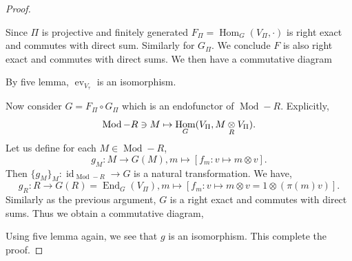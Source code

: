 \documentclass[8pt]{article}
\DeclareMathOperator{\Hom}{Hom}
\DeclareMathOperator{\End}{End}
\DeclareMathOperator{\Mod}{Mod}
\DeclareMathOperator{\id}{id}
\DeclareMathOperator{\ev}{ev}
\newcommand{\tens}[1]{%
  \mathbin{\mathop{\otimes}\displaylimits_{#1}}%
}
\begin{document}
\begin{proof}
  \begin{center}
  \end{center}
  Since $\Pi$ is projective and finitely generated $F_\Pi=\Hom_G(V_\Pi,\cdot)$ is right exact and commutes with direct sum. Similarly for $G_\Pi$. We conclude $F$ is also right exact and commutes with direct sums.
  We then have a commutative diagram
  \begin{center}
  \end{center}
  By five lemma, $\ev_{V_\tau}$ is an isomorphism.
  \par Now consider $G = F_\Pi\circ G_\Pi$ which is an endofunctor of $\Mod-R$. Explicitly,
  \begin{equation*}
    \Mod-R\ni M\mapsto \Hom_G(V_\Pi,M\tens{R}V_\Pi).
  \end{equation*}
  Let us define for each $M\in \Mod-R$,
  \begin{equation*}
    g_M:M\to G(M), m\mapsto [f_m:v\mapsto m\otimes v].
  \end{equation*}
  Then $\{g_M\}_{M}:\id_{\Mod-R}\to G$ is a natural transformation. We have,
  \begin{equation*}
    g_R:R\to G(R) = \End_G(V_\Pi), m\mapsto [f_m:v\mapsto m\otimes v = 1\otimes(\pi(m)v)].
  \end{equation*}
  Similarly as the previous argument, $G$ is a right exact and commutes with direct sums. Thus we obtain a commutative diagram,
  \begin{center}
  \end{center}
  Using five lemma again, we see that $g$ is an isomorphism. This complete the proof.
\end{proof}
\end{document}

